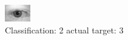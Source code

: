 \begin{figure}[h!]
\begin{center}
\includegraphics[width=0.60\columnwidth]{figures/ID537_class_2_target_3.png}
\end{center}
\caption{ Classification: 2 actual target: 3}
\label{fig:ID537_class_2_target_3}
\end{figure}
